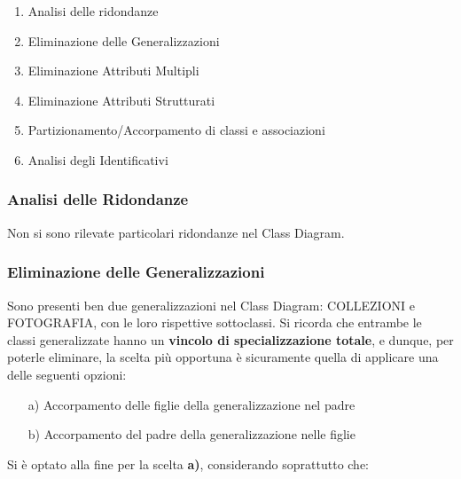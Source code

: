 \documentclass[a4paper]{article}
\begin{document}
	\begin{enumerate}
		\item Analisi delle ridondanze
		\item Eliminazione delle Generalizzazioni
		\item Eliminazione Attributi Multipli
		\item Eliminazione Attributi Strutturati
		\item Partizionamento/Accorpamento di classi e
			  associazioni
		\item Analisi degli Identificativi
	\end{enumerate}

	\vspace{20pt}
		\subsubsection{Analisi delle Ridondanze}
		\vspace{5pt}
		Non si sono rilevate particolari ridondanze nel
		Class Diagram.
		
		\vspace{20pt}
		\subsubsection{Eliminazione delle Generalizzazioni}
		\vspace{5pt}
		Sono presenti ben due generalizzazioni nel
		Class Diagram: COLLEZIONI e FOTOGRAFIA, con le loro
		rispettive sottoclassi. Si ricorda che entrambe le
		classi generalizzate hanno un \textbf{vincolo
		di specializzazione totale}, e dunque, per poterle
		eliminare, la scelta più opportuna è sicuramente
		quella di applicare una delle seguenti opzioni:
		
		\begin{itemize}
			\item[a)] Accorpamento delle figlie della
			generalizzazione nel padre
			\item[b)] Accorpamento del padre della
			generalizzazione nelle figlie
		\end{itemize}
		Si è optato alla fine per la scelta \textbf{a)},
		considerando soprattutto che:
		
\end{document}
